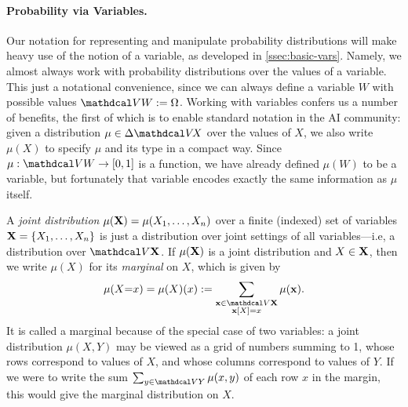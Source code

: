 \paragraph{Probability via Variables.}
Our notation for representing and manipulate probability distributions will make heavy use of the notion of a variable, as developed in \cref{ssec:basic-vars}. 
Namely, we almost always work with probability distributions over the values of a variable. This just a notational convenience, since we can always define a variable $W$ with possible values $\V W := \Omega$.  
Working with variables confers us a number of benefits,
the first of which is 
to enable standard notation in the AI community:
given a distribution $\mu \in \Delta \V\!X$ over the values of $X$,
we also write $\mu(X)$ to specify $\mu$ and its type in a compact way.
Since $\mu : \V W \to [0,1]$ is a function, we have already defined $\mu(W)$ to be a variable, but fortunately that variable encodes exactly the same information as $\mu$ itself.


A \emph{joint distribution} $\mu(\mathbf X) = \mu(X_1, \ldots, X_n)$ over a finite (indexed) set of variables $\mathbf X = \{X_1, \ldots, X_n\}$ is just a distribution over joint settings of all variables---i.e, a distribution over $\V \mat X$. 
If $\mu(\mathbf X)$ is a joint distribution and $X \in \mathbf X$, then we write $\mu(X)$ for its \emph{marginal} on $X$, which is given by
\[
    \mu(X{=}x) = \mu(X)(x) := \sum_{\substack{\mat x \in \V \mat X \\ \mat x[X] = x}} \mu(\mat x) .
\]
It is called a marginal because of the special case of two variables: a joint distribution $\mu(X,Y)$ may be viewed as a grid of numbers summing to 1, whose rows correspond to values of $X$, and whose columns correspond to values of $Y$. 
If we were to write the sum $\sum_{y \in \V Y} \mu(x,y)$ of each row $x$ in the margin, this would give the marginal distribution on $X$. 



